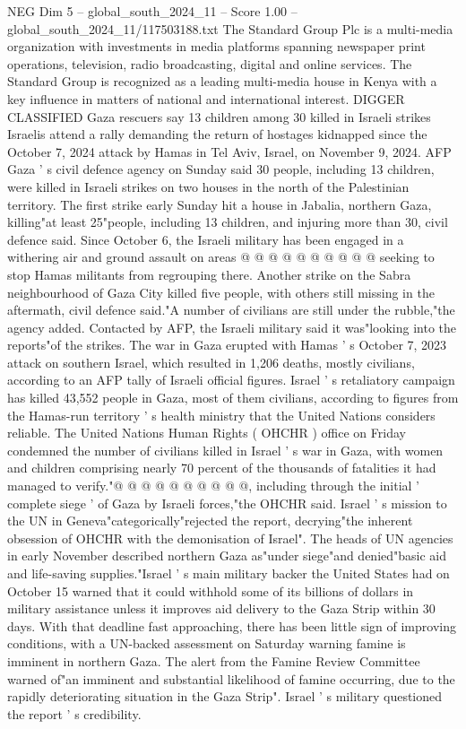 \begin{textsample}{NEG Dim 5 – global\_south\_2024\_11 – Score 1.00 – global\_south\_2024\_11/117503188.txt}  \label{ex:f5_neg_429}
The Standard Group Plc is a multi-media organization with investments in media platforms spanning newspaper print operations, television, radio broadcasting, digital and online services.
The Standard Group is recognized as a leading multi-media house in Kenya with a key influence in matters of national and international interest.
DIGGER CLASSIFIED Gaza rescuers say 13 children among 30 killed in Israeli strikes Israelis attend a rally demanding the return of hostages kidnapped since the October 7, 2024 attack by Hamas in Tel Aviv, Israel, on November 9, 2024.
AFP Gaza ' s civil defence agency on Sunday said 30 people, including 13 children, were killed in Israeli strikes on two houses in the north of the Palestinian territory.
The first strike early Sunday hit a house in Jabalia, northern Gaza, killing"at least 25"people, including 13 children, and injuring more than 30, civil defence said.
Since October 6, the Israeli military has been engaged in a withering air and ground assault on areas @ @ @ @ @ @ @ @ @ @ seeking to stop Hamas militants from regrouping there.
Another strike on the Sabra neighbourhood of Gaza City killed five people, with others still missing in the aftermath, civil defence said."A number of civilians are still under the rubble,"the agency added.
Contacted by AFP, the Israeli military said it was"looking into the reports"of the strikes.
The war in Gaza erupted with Hamas ' s October 7, 2023 attack on southern Israel, which resulted in 1,206 deaths, mostly civilians, according to an AFP tally of Israeli official figures.
Israel ' s retaliatory campaign has killed 43,552 people in Gaza, most of them civilians, according to figures from the Hamas-run territory ' s health ministry that the United Nations considers reliable.
The United Nations Human Rights ( OHCHR ) office on Friday condemned the number of civilians killed in Israel ' s war in Gaza, with women and children comprising nearly 70 percent of the thousands of fatalities it had managed to verify."@ @ @ @ @ @ @ @ @ @, including through the initial ' complete siege ' of Gaza by Israeli forces,"the OHCHR said.
Israel ' s mission to the UN in Geneva"categorically"rejected the report, decrying"the inherent obsession of OHCHR with the demonisation of Israel".
The heads of UN agencies in early November described northern Gaza as"under siege"and denied"basic aid and life-saving supplies."Israel ' s main military backer the United States had on October 15 warned that it could withhold some of its billions of dollars in military assistance unless it improves aid delivery to the Gaza Strip within 30 days.
With that deadline fast approaching, there has been little sign of improving conditions, with a UN-backed assessment on Saturday warning famine is imminent in northern Gaza.
The alert from the Famine Review Committee warned of"an imminent and substantial likelihood of famine occurring, due to the rapidly deteriorating situation in the Gaza Strip".
Israel ' s military questioned the report ' s credibility.

\end{textsample}
